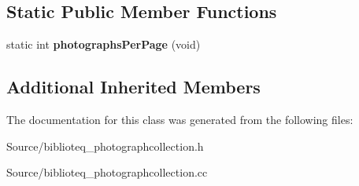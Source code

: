 \subsection*{Static Public Member Functions}
\begin{DoxyCompactItemize}
\item 
static int {\bfseries photographs\+Per\+Page} (void)\hypertarget{classbiblioteq__photographcollection_a9f78f0440562ccbaee24216d49c6e975}{}\label{classbiblioteq__photographcollection_a9f78f0440562ccbaee24216d49c6e975}

\end{DoxyCompactItemize}
\subsection*{Additional Inherited Members}


The documentation for this class was generated from the following files\+:\begin{DoxyCompactItemize}
\item 
Source/biblioteq\+\_\+photographcollection.\+h\item 
Source/biblioteq\+\_\+photographcollection.\+cc\end{DoxyCompactItemize}
